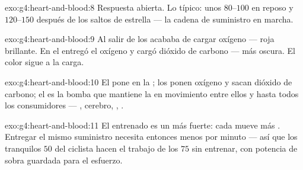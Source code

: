 \begin{solution}{exo:g4:heart-and-blood:8}
Respuesta abierta. Lo típico: unos $80$--$100$ en reposo y
$120$--$150$ después de los saltos de estrella --- la cadena de
suministro en marcha.
\end{solution}

\begin{solution}{exo:g4:heart-and-blood:9}
Al salir de los  acababa de cargar oxígeno --- roja brillante.
En el  entregó el oxígeno y cargó dióxido de carbono --- más
oscura. El color sigue a la carga.
\end{solution}

\begin{solution}{exo:g4:heart-and-blood:10}
El  pone  en la ; los  ponen
oxígeno y sacan dióxido de carbono; el  es la bomba que
mantiene la  en movimiento entre ellos y hasta todos los
consumidores --- , cerebro, , .
\end{solution}

\begin{solution}{exo:g4:heart-and-blood:11}
El  entrenado es un  más fuerte: cada  mueve más
. Entregar el mismo suministro necesita entonces menos 
por minuto --- así que los tranquilos $50$ del ciclista hacen el
trabajo de los $75$ sin entrenar, con potencia de sobra guardada para
el esfuerzo.
\end{solution}

